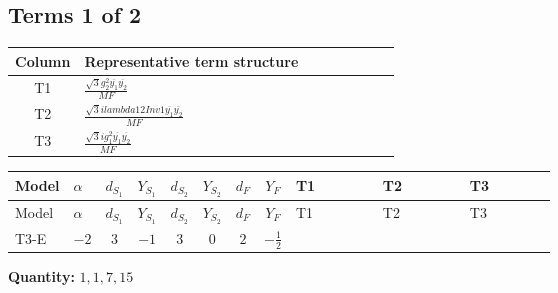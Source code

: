 \documentclass[8pt]{article}
\begin{document}
\begin{landscape}
\subsection*{Terms 1 of 2}
\begin{center}
\begin{tabular}{@{}c >{\raggedright\arraybackslash}p{0.82\linewidth}@{}}
\toprule
Column & Representative term structure \\
\midrule
T1 & \(\displaystyle \frac{\sqrt{3} g_{2}^{2} \overline{y_{1}} \overline{y_{2}}}{MF}\) \\
\midrule
T2 & \(\displaystyle \frac{\sqrt{3} i lambda12Inv1 \overline{y_{1}} \overline{y_{2}}}{MF}\) \\
\midrule
T3 & \(\displaystyle \frac{\sqrt{3} i g_{1}^{2} \overline{y_{1}} \overline{y_{2}}}{MF}\) \\
\midrule
\bottomrule
\end{tabular}
\end{center}
\smallskip
\tiny
\begin{longtable}{@{}llcccccc >{\raggedright\arraybackslash}p{0.21\linewidth} >{\raggedright\arraybackslash}p{0.21\linewidth} >{\raggedright\arraybackslash}p{0.21\linewidth}@{}}
\toprule
Model & $\alpha$ & $d_{S_1}$ & $Y_{S_1}$ & $d_{S_2}$ & $Y_{S_2}$ & $d_F$ & $Y_F$ & T1 & T2 & T3 \\
\midrule
\endfirsthead
\toprule
Model & $\alpha$ & $d_{S_1}$ & $Y_{S_1}$ & $d_{S_2}$ & $Y_{S_2}$ & $d_F$ & $Y_F$ & T1 & T2 & T3 \\
\midrule
\endhead
T3-E & $-2$ & $3$ & $-1$ & $3$ & $0$ & $2$ & $-\frac{1}{2}$ & \scriptsize\adjustbox{max width=\linewidth}{$\begin{gathered} \frac{\sqrt{3} g_{2}^{2} \overline{y_{1}} \overline{y_{2}}}{6 MF}\end{gathered}$} & \scriptsize\adjustbox{max width=\linewidth}{$\begin{gathered} - \frac{\sqrt{3} i lambda12Inv1 \overline{y_{1}} \overline{y_{2}}}{6 MF}\end{gathered}$} & \scriptsize\adjustbox{max width=\linewidth}{$\begin{gathered} \frac{\sqrt{3} i g_{1}^{2} \overline{y_{1}} \overline{y_{2}}}{8 MF}\end{gathered}$} \\
\midrule
\bottomrule
\end{longtable}
\clearpage
\noindent\textbf{Quantity: }$\mathrm{1,1,7,15}$\par\smallskip

\end{landscape}
\end{document}
